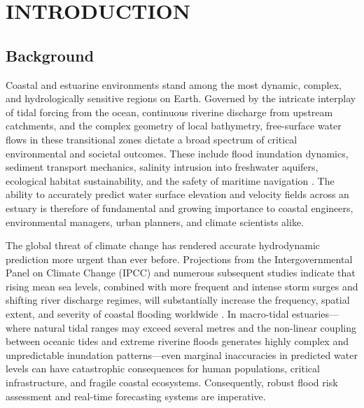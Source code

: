 \chapter{INTRODUCTION}

\section{Background}

Coastal and estuarine environments stand among the most dynamic, complex, and
hydrologically sensitive regions on Earth. Governed by the intricate interplay of
tidal forcing from the ocean, continuous riverine discharge from upstream catchments,
and the complex geometry of local bathymetry, free-surface water flows in these transitional zones dictate a broad spectrum of
critical environmental and societal outcomes. These include flood inundation dynamics, sediment
transport mechanics, salinity intrusion into freshwater aquifers, ecological habitat sustainability, and
the safety of maritime navigation \cite{Sottolichio2000, Jalón-Rojas2018}. The ability to
accurately predict water surface elevation and velocity fields across an
estuary is therefore of fundamental and growing importance to coastal engineers,
environmental managers, urban planners, and climate scientists alike.

The global threat of climate change has rendered accurate hydrodynamic
prediction more urgent than ever before. Projections from the
Intergovernmental Panel on Climate Change (IPCC) and numerous subsequent studies indicate that rising mean sea
levels, combined with more frequent and intense storm surges and shifting river
discharge regimes, will substantially increase the frequency, spatial extent, and severity
of coastal flooding worldwide \cite{IPCC2021, Vousdoukas2018, Alfieri2017}.
In macro-tidal estuaries---where natural tidal ranges may exceed several metres
and the non-linear coupling between oceanic tides and extreme riverine floods
generates highly complex and unpredictable inundation patterns---even marginal inaccuracies in
predicted water levels can have catastrophic consequences for human
populations, critical infrastructure, and fragile coastal ecosystems. Consequently, robust flood risk assessment and real-time forecasting systems are imperative.

